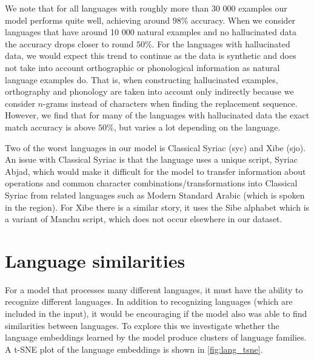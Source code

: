 \documentclass[11pt,a4paper]{article}
\begin{document}
We note that for all languages with roughly more than 30 000 examples
our model performs quite well, achieving around $98\%$ accuracy. When
we consider languages that have around 10 000 natural examples and
no hallucinated data the accuracy drops closer to round $50\%$. For
the languages with hallucinated data, we would expect this trend to
continue as the data is synthetic and does not take into account
orthographic or phonological information as natural language examples
do.  That is, when constructing hallucinated examples, orthography and
phonology are taken into account only indirectly because we consider
$n$-grams instead of characters when finding the replacement
sequence. However, we find that for many of the languages with
hallucinated data the exact match accuracy is above $50\%$, but varies
a lot depending on the language.

Two of the worst languages in our model is Classical Syriac (syc) and
Xibe (sjo).  An issue with Classical Syriac is that the language uses
a unique script, Syriac Abjad, which would make it difficult for the
model to transfer information about operations and common character
combinations/transformations into Classical Syriac from related
languages such as Modern Standard Arabic (which is spoken in the
region). For Xibe there is a similar story, it uses the Sibe alphabet
which is a variant of Manchu script, which does not occur elsewhere in
our dataset.



\section{Language similarities}

For a model that processes many different languages, it must have the
ability to recognize different languages.  In addition to recognizing
languages (which are included in the input), it would be encouraging
if the model also was able to find similarities between languages.  To
explore this we investigate whether the language embeddings learned by
the model produce clusters of language families. A t-SNE plot of the
language embeddings is shown in \cref{fig:lang_tsne}.
\end{document}
